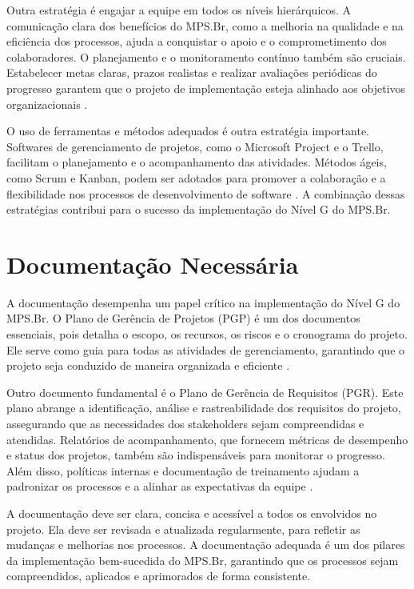 \documentclass[
	12pt,				%
	oneside,			%
	a4paper,			%
	english,			%
	brazil				%
	]{abntex2unama}
\begin{document}
Outra estratégia é engajar a equipe em todos os níveis hierárquicos. A comunicação clara dos benefícios do MPS.Br, como a melhoria na qualidade e na eficiência dos processos, ajuda a conquistar o apoio e o comprometimento dos colaboradores. O planejamento e o monitoramento contínuo também são cruciais. Estabelecer metas claras, prazos realistas e realizar avaliações periódicas do progresso garantem que o projeto de implementação esteja alinhado aos objetivos organizacionais \cite{strategic_planning}.

O uso de ferramentas e métodos adequados é outra estratégia importante. Softwares de gerenciamento de projetos, como o Microsoft Project e o Trello, facilitam o planejamento e o acompanhamento das atividades. Métodos ágeis, como Scrum e Kanban, podem ser adotados para promover a colaboração e a flexibilidade nos processos de desenvolvimento de software \cite{agile_methods}. A combinação dessas estratégias contribui para o sucesso da implementação do Nível G do MPS.Br.

\chapter{Documentação Necessária}
A documentação desempenha um papel crítico na implementação do Nível G do MPS.Br. O Plano de Gerência de Projetos (PGP) é um dos documentos essenciais, pois detalha o escopo, os recursos, os riscos e o cronograma do projeto. Ele serve como guia para todas as atividades de gerenciamento, garantindo que o projeto seja conduzido de maneira organizada e eficiente \cite{pgp}.

Outro documento fundamental é o Plano de Gerência de Requisitos (PGR). Este plano abrange a identificação, análise e rastreabilidade dos requisitos do projeto, assegurando que as necessidades dos stakeholders sejam compreendidas e atendidas. Relatórios de acompanhamento, que fornecem métricas de desempenho e status dos projetos, também são indispensáveis para monitorar o progresso. Além disso, políticas internas e documentação de treinamento ajudam a padronizar os processos e a alinhar as expectativas da equipe \cite{pgr}.

A documentação deve ser clara, concisa e acessível a todos os envolvidos no projeto. Ela deve ser revisada e atualizada regularmente, para refletir as mudanças e melhorias nos processos. A documentação adequada é um dos pilares da implementação bem-sucedida do MPS.Br, garantindo que os processos sejam compreendidos, aplicados e aprimorados de forma consistente.
\end{document}

